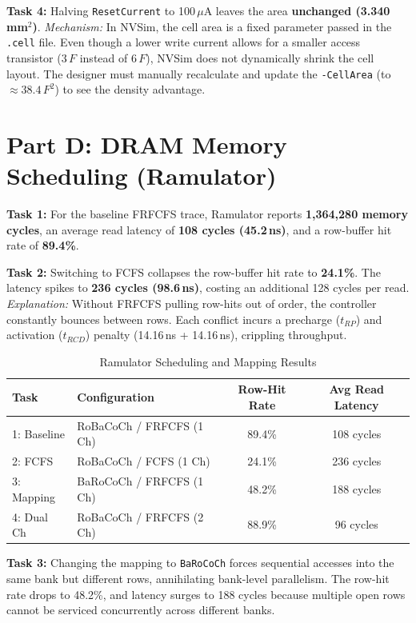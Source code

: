 \documentclass[11pt,a4paper]{article}
\begin{document}
\textbf{Task 4:} Halving \texttt{ResetCurrent} to 100\,$\mu$A leaves the area \textbf{unchanged (3.340\,mm$^2$)}. 
\textit{Mechanism:} In NVSim, the cell area is a fixed parameter passed in the \texttt{.cell} file. Even though a lower write current allows for a smaller access transistor ($3\,F$ instead of $6\,F$), NVSim does not dynamically shrink the cell layout. The designer must manually recalculate and update the \texttt{-CellArea} (to $\approx 38.4\,F^2$) to see the density advantage.

\section{Part D: DRAM Memory Scheduling (Ramulator)}
\textbf{Task 1:} For the baseline FRFCFS trace, Ramulator reports \textbf{1,364,280 memory cycles}, an average read latency of \textbf{108 cycles (45.2\,ns)}, and a row-buffer hit rate of \textbf{89.4\%}.

\textbf{Task 2:} Switching to FCFS collapses the row-buffer hit rate to \textbf{24.1\%}. The latency spikes to \textbf{236 cycles (98.6\,ns)}, costing an additional 128 cycles per read. 
\textit{Explanation:} Without FRFCFS pulling row-hits out of order, the controller constantly bounces between rows. Each conflict incurs a precharge ($t_{RP}$) and activation ($t_{RCD}$) penalty (14.16\,ns + 14.16\,ns), crippling throughput.

\begin{table}[H]
\centering
\caption{Ramulator Scheduling and Mapping Results}
\label{tab:ramulator}
\begin{tabular}{@{}llcc@{}}
\toprule
\textbf{Task} & \textbf{Configuration} & \textbf{Row-Hit Rate} & \textbf{Avg Read Latency} \\ \midrule
1: Baseline & RoBaCoCh / FRFCFS (1 Ch) & 89.4\% & 108 cycles \\
2: FCFS & RoBaCoCh / FCFS (1 Ch) & 24.1\% & 236 cycles \\
3: Mapping & BaRoCoCh / FRFCFS (1 Ch) & 48.2\% & 188 cycles \\
4: Dual Ch & RoBaCoCh / FRFCFS (2 Ch) & 88.9\% & 96 cycles \\ \bottomrule
\end{tabular}
\end{table}

\textbf{Task 3:} Changing the mapping to \texttt{BaRoCoCh} forces sequential accesses into the same bank but different rows, annihilating bank-level parallelism. The row-hit rate drops to 48.2\%, and latency surges to 188 cycles because multiple open rows cannot be serviced concurrently across different banks.
\end{document}
